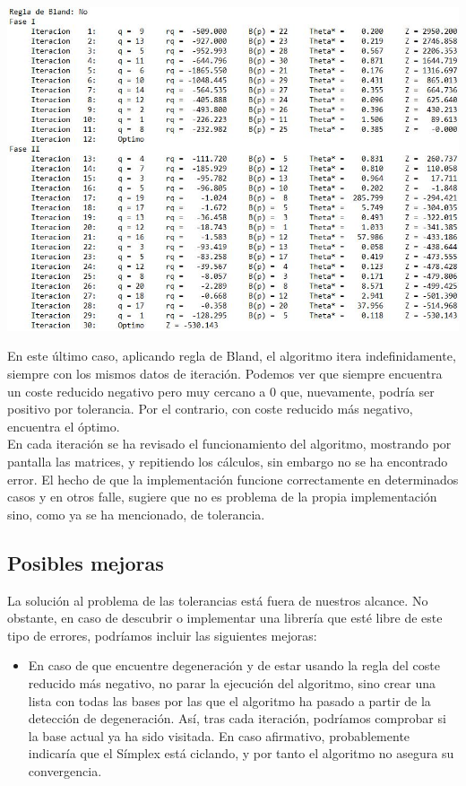 \documentclass[12pt, titlepage]{article}
\begin{document}
\begin{center}
\includegraphics[scale=0.45]{imagenes/p2_no_bland.JPG}
\end{center}

En este último caso, aplicando regla de Bland, el algoritmo itera indefinidamente, siempre con los mismos datos de iteración. Podemos ver que siempre encuentra un coste reducido negativo pero muy cercano a $0$ que, nuevamente, podría ser positivo por tolerancia. Por el contrario, con coste reducido más negativo, encuentra el óptimo.\\
En cada iteración se ha revisado el funcionamiento del algoritmo, mostrando por pantalla las matrices, y repitiendo los cálculos, sin embargo no se ha encontrado error. El hecho de que la implementación funcione correctamente en determinados casos y en otros falle, sugiere que no es problema de la propia implementación sino, como ya se ha mencionado, de tolerancia.

\subsection{Posibles mejoras}
La solución al problema de las tolerancias está fuera de nuestros alcance. No obstante, en caso de descubrir o implementar una librería que esté libre de este tipo de errores, podríamos incluir las siguientes mejoras:
\begin{itemize}
\item	En caso de que encuentre degeneración y de estar usando la regla del coste reducido más negativo, no parar la ejecución del algoritmo, sino crear una lista con todas las bases por las que el algoritmo ha pasado a partir de la detección de degeneración. Así, tras cada iteración, podríamos comprobar si la base actual ya ha sido visitada. En caso afirmativo, probablemente indicaría que el Símplex está ciclando, y por tanto el algoritmo no asegura su convergencia.
\end{itemize}
\newpage
\end{document}
